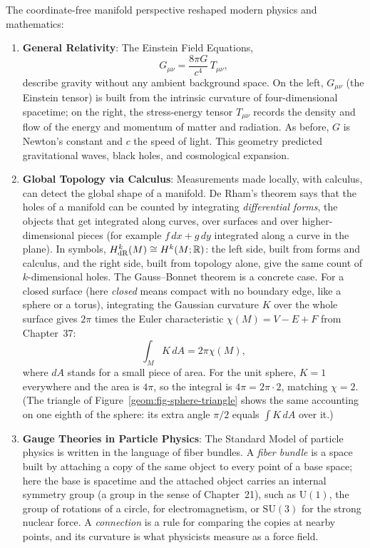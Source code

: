 The coordinate-free manifold perspective reshaped modern physics and mathematics:
\begin{enumerate}
  \item \textbf{General Relativity}: The Einstein Field Equations,
  \[
  G_{\mu\nu} = \frac{8\pi G}{c^4}\, T_{\mu\nu},
  \]
  describe gravity without any ambient background space. On the left, $G_{\mu\nu}$ (the Einstein tensor) is built from the intrinsic curvature of four-dimensional spacetime; on the right, the stress-energy tensor $T_{\mu\nu}$ records the density and flow of the energy and momentum of matter and radiation. As before, $G$ is Newton's constant and $c$ the speed of light. This geometry predicted gravitational waves, black holes, and cosmological expansion.
  \item \textbf{Global Topology via Calculus}: Measurements made locally, with calculus, can detect the global shape of a manifold. De Rham's theorem says that the holes of a manifold can be counted by integrating \emph{differential forms}, the objects that get integrated along curves, over surfaces and over higher-dimensional pieces (for example $f\,dx + g\,dy$ integrated along a curve in the plane). In symbols, $H^k_{\mathrm{dR}}(M) \cong H^k(M; \mathbb{R})$: the left side, built from forms and calculus, and the right side, built from topology alone, give the same count of $k$-dimensional holes. The Gauss--Bonnet theorem is a concrete case. For a closed surface (here \emph{closed} means compact with no boundary edge, like a sphere or a torus), integrating the Gaussian curvature $K$ over the whole surface gives $2\pi$ times the Euler characteristic $\chi(M) = V - E + F$ from Chapter~37:
  \[
  \int_M K \, dA = 2\pi \chi(M),
  \]
  where $dA$ stands for a small piece of area. For the unit sphere, $K = 1$ everywhere and the area is $4\pi$, so the integral is $4\pi = 2\pi \cdot 2$, matching $\chi = 2$. (The triangle of Figure~\ref{geom:fig-sphere-triangle} shows the same accounting on one eighth of the sphere: its extra angle $\pi/2$ equals $\int K\,dA$ over it.)
  \item \textbf{Gauge Theories in Particle Physics}: The Standard Model of particle physics is written in the language of fiber bundles. A \emph{fiber bundle} is a space built by attaching a copy of the same object to every point of a base space; here the base is spacetime and the attached object carries an internal symmetry group (a group in the sense of Chapter~21), such as $\mathrm{U}(1)$, the group of rotations of a circle, for electromagnetism, or $\mathrm{SU}(3)$ for the strong nuclear force. A \emph{connection} is a rule for comparing the copies at nearby points, and its curvature is what physicists measure as a force field.
\end{enumerate}

